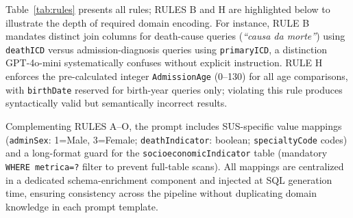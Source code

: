\documentclass[conference]{IEEEtran}
\begin{document}
Table~\ref{tab:rules} presents all rules; RULES B and H are highlighted below to illustrate the depth of required domain encoding.
For instance, RULE B mandates distinct join columns for death-cause queries (\textit{``causa da morte''}) using \texttt{deathICD} versus admission-diagnosis queries using \texttt{primaryICD}, a distinction GPT-4o-mini systematically confuses without explicit instruction. RULE H enforces the pre-calculated integer \texttt{AdmissionAge} (0--130) for all age comparisons, with \texttt{birthDate} reserved for birth-year queries only; violating this rule produces syntactically valid but semantically incorrect results.

Complementing RULES A--O, the prompt includes SUS-specific value mappings
(\texttt{adminSex}: 1=Male, 3=Female; \texttt{deathIndicator}: boolean; \texttt{specialtyCode} codes) and a long-format guard for the \texttt{socioeconomicIndicator} table (mandatory \texttt{WHERE metrica=?} filter to prevent full-table scans). All mappings are centralized in a dedicated schema-enrichment component and injected at SQL generation time, ensuring consistency across the pipeline without duplicating domain knowledge in each prompt template.
\end{document}
